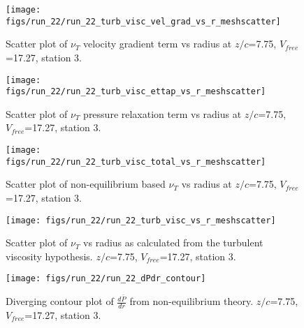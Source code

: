 \begin{figure}[H]
\centering
\texttt{[image: figs/run\_22/run\_22\_turb\_visc\_vel\_grad\_vs\_r\_meshscatter]}
\caption{Scatter plot of $\nu_T$ velocity gradient term vs radius at $z/c$=7.75, $V_{free}$=17.27, station 3.}
\end{figure}


\begin{figure}[H]
\centering
\texttt{[image: figs/run\_22/run\_22\_turb\_visc\_ettap\_vs\_r\_meshscatter]}
\caption{Scatter plot of $\nu_T$ pressure relaxation term vs radius at $z/c$=7.75, $V_{free}$=17.27, station 3.}
\end{figure}


\begin{figure}[H]
\centering
\texttt{[image: figs/run\_22/run\_22\_turb\_visc\_total\_vs\_r\_meshscatter]}
\caption{Scatter plot of non-equilibrium based $\nu_T$ vs radius at $z/c$=7.75, $V_{free}$=17.27, station 3.}
\end{figure}


\begin{figure}[H]
\centering
\texttt{[image: figs/run\_22/run\_22\_turb\_visc\_vs\_r\_meshscatter]}
\caption{Scatter plot of $\nu_T$ vs radius as calculated from the turbulent viscosity hypothesis. $z/c$=7.75, $V_{free}$=17.27, station 3.}
\end{figure}


\begin{figure}[H]
\centering
\texttt{[image: figs/run\_22/run\_22\_dPdr\_contour]}
\caption{Diverging contour plot of $\frac{d\bar{P}}{dr}$ from non-equilibrium theory. $z/c$=7.75, $V_{free}$=17.27, station 3.}
\end{figure}


